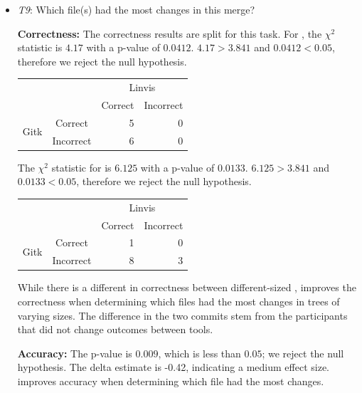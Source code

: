 \begin{itemize}
  \item \emph{T9}: Which file(s) had the most changes in this merge?

    \textbf{Correctness:}
    The correctness results are split for this task. For \comA, the
    $\chi^2$ statistic is $4.17$ with a p-value of $0.0412$. $4.17 >
    3.841$ and $0.0412 < 0.05$, therefore we reject the null hypothesis.

    \vspace{2mm}
    \begin{tabular}{cc|rr}
                             &           & \multicolumn{2}{c}{Linvis}\\
                             &           & Correct                      & Incorrect\\\hline
      \multirow{2}{*}{Gitk}  & Correct   & 5                            & 0\\
                             & Incorrect & 6                            & 0\\
    \end{tabular}
    \vspace{3mm}

    The $\chi^2$ statistic for \comB is $6.125$ with a p-value of
    $0.0133$. $6.125 > 3.841$ and $0.0133 < 0.05$, therefore we reject
    the null hypothesis.

    \vspace{2mm}
    \begin{tabular}{cc|rr}
                             &           & \multicolumn{2}{c}{Linvis}\\
                             &           & Correct                      & Incorrect\\\hline
      \multirow{2}{*}{Gitk}  & Correct   & 1                            & 0\\
                             & Incorrect & 8                            & 3\\
    \end{tabular}
    \vspace{3mm}

    While there is a different in correctness between different-sized
    , \tool improves the correctness when determining which files
    had the most changes in trees of varying sizes. The difference in
    the two commits stem from the participants that did not change
    outcomes between tools.

    \textbf{Accuracy:} The p-value is $0.009$, which is less than
    $0.05$; we reject the null hypothesis. The delta estimate is -0.42,
    indicating a medium effect size. \tool improves accuracy when
    determining which file had the most changes.


\end{itemize}
